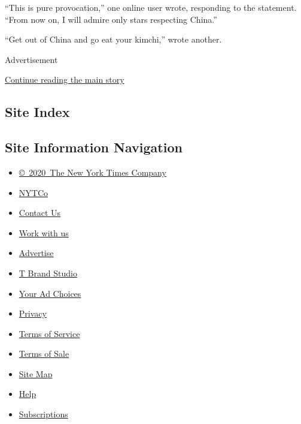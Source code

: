 ``This is pure provocation,'' one online user wrote, responding to the
statement. ``From now on, I will admire only stars respecting China.''

``Get out of China and go eat your kimchi,'' wrote another.

Advertisement

\protect\hyperlink{after-bottom}{Continue reading the main story}

\hypertarget{site-index}{%
\subsection{Site Index}\label{site-index}}

\hypertarget{site-information-navigation}{%
\subsection{Site Information
Navigation}\label{site-information-navigation}}

\begin{itemize}
\tightlist
\item
  \href{https://help.nytimes3xbfgragh.onion/hc/en-us/articles/115014792127-Copyright-notice}{©~2020~The
  New York Times Company}
\end{itemize}

\begin{itemize}
\tightlist
\item
  \href{https://www.nytco.com/}{NYTCo}
\item
  \href{https://help.nytimes3xbfgragh.onion/hc/en-us/articles/115015385887-Contact-Us}{Contact
  Us}
\item
  \href{https://www.nytco.com/careers/}{Work with us}
\item
  \href{https://nytmediakit.com/}{Advertise}
\item
  \href{http://www.tbrandstudio.com/}{T Brand Studio}
\item
  \href{https://www.nytimes3xbfgragh.onion/privacy/cookie-policy\#how-do-i-manage-trackers}{Your
  Ad Choices}
\item
  \href{https://www.nytimes3xbfgragh.onion/privacy}{Privacy}
\item
  \href{https://help.nytimes3xbfgragh.onion/hc/en-us/articles/115014893428-Terms-of-service}{Terms
  of Service}
\item
  \href{https://help.nytimes3xbfgragh.onion/hc/en-us/articles/115014893968-Terms-of-sale}{Terms
  of Sale}
\item
  \href{https://spiderbites.nytimes3xbfgragh.onion}{Site Map}
\item
  \href{https://help.nytimes3xbfgragh.onion/hc/en-us}{Help}
\item
  \href{https://www.nytimes3xbfgragh.onion/subscription?campaignId=37WXW}{Subscriptions}
\end{itemize}
